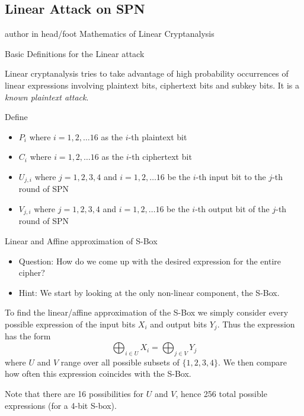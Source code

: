 \documentclass[9pt]{beamer}
\begin{document}
\subsection{Linear Attack on SPN}
\begin{frame}
\begin{beamercolorbox}[ht=2.5ex,dp=1.125ex,center,rounded=true,shadow=true]{author in head/foot}
Mathematics of Linear Cryptanalysis
\end{beamercolorbox}
\end{frame}

\begin{frame}
Basic Definitions for the Linear attack

\vspace{5 mm}
\pause Linear cryptanalysis tries to take advantage of high probability occurrences of linear expressions involving plaintext bits, ciphertext bits and subkey bits. It is a {\it known plaintext attack}.

\vspace{5 mm}
\pause Define 
\begin{itemize}[<+->]
\item{$P_i$ where $i = 1, 2, \dots 16$ as the $i$-th plaintext bit}
\item{$C_i$ where $i = 1, 2, \dots 16$ as the $i$-th ciphertext bit}
\item{$U_{j,i}$ where $j = 1, 2, 3, 4$ and $i = 1, 2, \dots 16$ be the $i$-th input bit to the $j$-th round of SPN}
\item{$V_{j,i}$ where $j = 1, 2, 3, 4$ and $i = 1, 2, \dots 16$ be the $i$-th output bit of the $j$-th round of SPN}
\end{itemize}
\end{frame}

\begin{frame}
Linear and Affine approximation of S-Box

\vspace{5mm}
\begin{itemize}[<+->]
\item Question: How do we come up with the desired expression for the entire cipher? 
\item Hint: We start by looking at the only non-linear component, the S-Box.
\end{itemize}

\vspace{5mm}
\pause To find the linear/affine approximation of the S-Box we simply consider every possible expression of the input bits $X_i$ and output bits $Y_j$. \pause Thus the expression has the form
\[ \bigoplus_{i \in U} X_i = \bigoplus_{j \in V} Y_j \]
where $U$ and $V$ range over all possible subsets of $\{1, 2, 3 ,4\}$. \pause We then compare how often this expression coincides with the S-Box.

\vspace{5mm}
\pause Note that there are 16 possibilities for $U$ and $V$, hence 256 total possible expressions (for a 4-bit S-box).
\end{frame}
\end{document}

